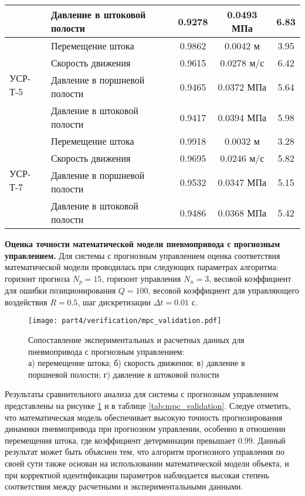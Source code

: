 \begin{table}[ht]
\begin{tabular}{llccc}
		                         & Давление в штоковой полости  & \num{0.9278} & \num{0.0493} МПа & \num{6.83}   \\
		\hline
		\multirow{4}{*}{УСР-Т-5} & Перемещение штока            & \num{0.9862} & \num{0.0042} м   & \num{3.95}   \\
		                         & Скорость движения            & \num{0.9615} & \num{0.0278} м/с & \num{6.42}   \\
		                         & Давление в поршневой полости & \num{0.9465} & \num{0.0372} МПа & \num{5.64}   \\
		                         & Давление в штоковой полости  & \num{0.9417} & \num{0.0394} МПа & \num{5.98}   \\
		\hline
		\multirow{4}{*}{УСР-Т-7} & Перемещение штока            & \num{0.9918} & \num{0.0032} м   & \num{3.28}   \\
		                         & Скорость движения            & \num{0.9695} & \num{0.0246} м/с & \num{5.82}   \\
		                         & Давление в поршневой полости & \num{0.9532} & \num{0.0347} МПа & \num{5.15}   \\
		                         & Давление в штоковой полости  & \num{0.9486} & \num{0.0368} МПа & \num{5.42}   \\
		\hline
	\end{tabular}
\end{table}

\textbf{Оценка точности математической модели пневмопривода с прогнозным управлением.}
Для системы с прогнозным управлением оценка соответствия математической
модели проводилась при следующих параметрах алгоритма: горизонт прогноза $N_p = 15$,
горизонт управления $N_u = 3$, весовой коэффициент для ошибки позиционирования $Q = 100$,
весовой коэффициент для управляющего воздействия $R = \num{0.5}$, шаг дискретизации $\Delta t = \num{0.01}$ с.

\begin{figure}[ht]
	\centering
	\texttt{[image: part4/verification/mpc\_validation.pdf]}
	\caption{Сопоставление экспериментальных и расчетных данных для пневмопривода с прогнозным управлением:\\
		а) перемещение штока; б) скорость движения; в) давление в поршневой полости; г) давление в штоковой полости}
	\label{fig:mpc_validation}
\end{figure}

Результаты сравнительного анализа для системы с прогнозным управлением представлены
на рисунке \ref{fig:mpc_validation} и в таблице \ref{tab:mpc_validation}. Следуе
отметить, что математическая модель обеспечивает высокую точность
прогнозирования динамики пневмопривода при прогнозном управлении,
особенно в отношении перемещения штока, где коэффициент детерминации
превышает 0.99. Данный результат может быть объяснен тем, что алгоритм прогнозного
управления по своей сути также основан на использовании математической модели объекта,
и при корректной идентификации параметров наблюдается высокая степень соответствия между
расчетными и экспериментальными данными.

